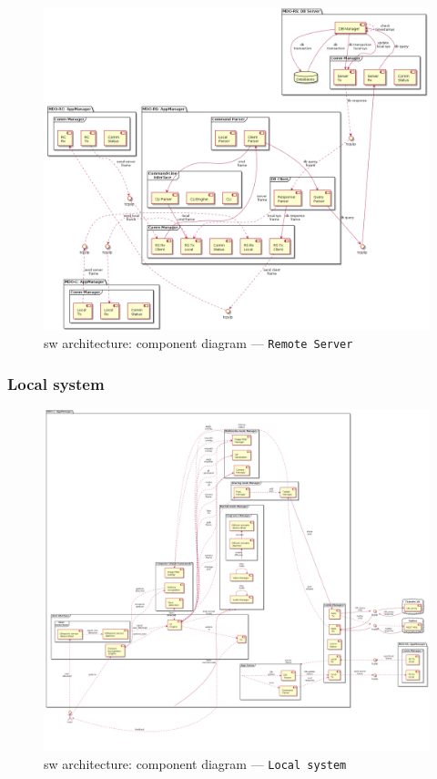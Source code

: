 \begin{figure}[htb!]
\centering
    \includegraphics[width=0.9\columnwidth]{./img/component-diag-rs.png}
  \caption{\gls{sw} architecture: component diagram --- \texttt{Remote Server}}%
\label{fig:component-diag-rs}
\end{figure}

\subsubsection{Local system}
\label{sec:local-system-arch}

\begin{figure}[htb!]
\centering
    \includegraphics[width=1.03\columnwidth]{./img/component-diag-local.png}
  \caption{\gls{sw} architecture: component diagram --- \texttt{Local system}}%
\label{fig:component-diag-local}
\end{figure}


